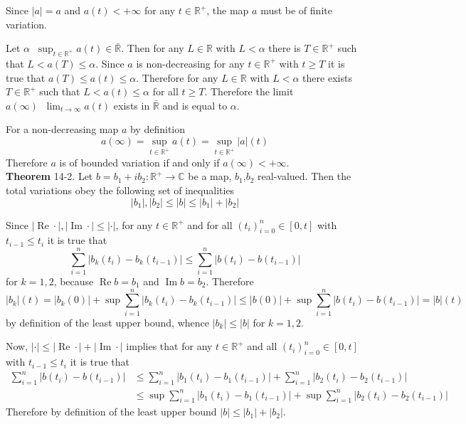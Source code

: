 \documentclass[a4paper]{article}
\newcommand{\clo}[1]{\left [ #1 \right ]}
\newcommand{\brac}[1]{\left ( #1 \right )}
\newcommand{\abs}[1]{\left | #1 \right |}
\newcommand{\Rbar}{{\bar{\mathbb{R}}}}
\newcommand{\Real}{\mathbb{R}}
\newcommand{\Cplx}{\mathbb{C}}
\newcommand{\defn}{\mathop{\overset{\Delta}{=}}\nolimits}
\newcommand{\re}{\operatorname{Re}\nolimits}
\newcommand{\im}{\operatorname{Im}\nolimits}
\begin{document}
Since $\abs{a}=a$ and $a\brac{t}<+\infty$ for any $t\in \Real^+$, the map $a$ must be of finite variation.

Let $\alpha\defn \sup_{t\in \Real^+} a\brac{t}\in \Rbar$. Then for any $L\in \Real$ with $L<\alpha$ there is $T\in \Real^+$ such that $L<a\brac{T}\leq \alpha$. Since $a$ is non-decreasing for any $t\in \Real^+$ with $t\geq T$ it is true that $a\brac{T}\leq a\brac{t}\leq \alpha$. Therefore for any $L\in \Real$ with $L<\alpha$ there exists $T\in \Real^+$ such that $L<a\brac{t}\leq \alpha$ for all $t\geq T$. Therefore the limit $a\brac{\infty}\defn\lim_{t\to\infty} a\brac{t}$ exists in $\Rbar$ and is equal to $\alpha$.

For a non-decreasing map $a$ by definition \[a\brac{\infty}=\sup_{t\in \Real^+}a\brac{t}=\sup_{t\in \Real^+}\abs{a}\brac{t}\] Therefore $a$ is of bounded variation if and only if $a\brac{\infty}<+\infty$.\\

\label{thm:cplx_total_var_ineq}\noindent\textbf{Theorem} 14-2.
Let $b=b_1 + i b_2:\Real^+\to\Cplx$ be a map, $b_1$,$b_2$ real-valued. Then the total variations obey the following set of inequalities \[\abs{b_1},\abs{b_2}\leq \abs{b}\leq \abs{b_1}+\abs{b_2}\]

Since $\abs{\re\cdot},\abs{\im\cdot}\leq \abs{\cdot}$, for any $t\in \Real^+$ and for all $\brac{t_i}_{i=0}^n\in\clo{0,t}$ with $t_{i-1}\leq t_i$ it is true that \[\sum_{i=1}^n \abs{b_k\brac{t_i}-b_k\brac{t_{i-1}}}\leq \sum_{i=1}^n \abs{b\brac{t_i}-b\brac{t_{i-1}}}\] for $k=1,2$, because $\re b = b_1$ and $\im b = b_2$. Therefore \[\abs{b_k}\brac{t}=\abs{b_k\brac{0}}+\sup\sum_{i=1}^n \abs{b_k\brac{t_i}-b_k\brac{t_{i-1}}}\leq \abs{b\brac{0}}+\sup\sum_{i=1}^n \abs{b\brac{t_i}-b\brac{t_{i-1}}}=\abs{b}\brac{t}\] by definition of the least upper bound, whence $\abs{b_k}\leq \abs{b}$ for $k=1,2$.

Now, $\abs{\cdot}\leq \abs{\re\cdot}+\abs{\im\cdot}$ implies that for any $t\in \Real^+$ and all $\brac{t_i}_{i=0}^n\in\clo{0,t}$ with $t_{i-1}\leq t_i$ it is true that \begin{align*}\sum_{i=1}^n \abs{b\brac{t_i}-b\brac{t_{i-1}}}&\leq \sum_{i=1}^n \abs{b_1\brac{t_i}-b_1\brac{t_{i-1}}} + \sum_{i=1}^n \abs{b_2\brac{t_i}-b_2\brac{t_{i-1}}} \\&\leq \sup\sum_{i=1}^n \abs{b_1\brac{t_i}-b_1\brac{t_{i-1}}} + \sup\sum_{i=1}^n \abs{b_2\brac{t_i}-b_2\brac{t_{i-1}}} \end{align*} Therefore by definition of the least upper bound $\abs{b}\leq \abs{b_1}+\abs{b_2}$.\\
\end{document}

